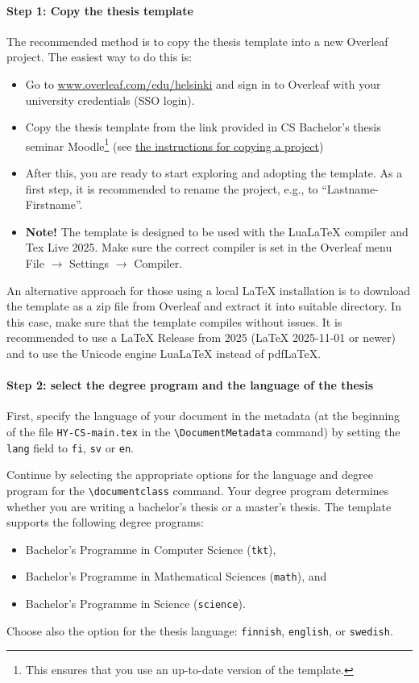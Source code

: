 \documentclass[english, manual, a4paper]{csthesis}
\begin{document}
\paragraph{Step 1: Copy the thesis template}
The recommended method is to copy the thesis template into a new Overleaf project. The easiest way to do this is:
\begin{itemize}
    \item Go to \href{https://www.overleaf.com/edu/helsinki}{www.overleaf.com/edu/helsinki} and sign in to Overleaf with your university credentials (SSO login).
    \item Copy the thesis template from the link provided in CS Bachelor's thesis seminar Moodle\footnote{This ensures that you use an up-to-date version of the template.}
    (see \href{https://docs.overleaf.com/managing-projects-and-files/copying-a-project}{the instructions for copying a project})
    \item After this, you are ready to start exploring and adopting the template. As a first step, it is recommended to rename the project, e.g., to “Lastname-Firstname”.
\item {\bf Note!} The template is designed to be used with the LuaLaTeX compiler and Tex Live 2025. Make sure the correct compiler is set in the Overleaf menu File $\rightarrow$ Settings $\rightarrow$ Compiler.
\end{itemize}
An alternative approach for those using a local \LaTeX{} installation is to download the template as a zip file from Overleaf and extract it into suitable directory. In this case, make sure that the template compiles without issues. It is recommended to use a LaTeX Release from 2025 (LaTeX 2025-11-01 or newer) and to use the Unicode engine LuaLaTeX
instead of pdfLaTeX.

\paragraph{Step 2: select the degree program and the language of the thesis}
First, specify the language of your document in the metadata (at the beginning of the file \texttt{HY-CS-main.tex} in the \texttt{\textbackslash DocumentMetadata} command) by setting the \texttt{lang} field to \texttt{fi}, \texttt{sv} or \texttt{en}.

Continue by selecting the appropriate options for the language and degree program for the \texttt{\textbackslash documentclass} command. Your degree program determines whether you are writing a bachelor's thesis or a master's thesis.
The template supports the following degree programs:
\begin{itemize}
\item Bachelor’s Programme in Computer Science (\texttt{tkt}),
\item Bachelor’s Programme in Mathematical Sciences (\texttt{math}), and
\item Bachelor’s Programme in Science (\texttt{science}).
\end{itemize}
Choose also the option for the thesis language: \texttt{finnish}, \texttt{english}, or \texttt{swedish}.
\end{document}
